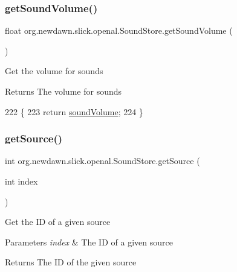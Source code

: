 \subsubsection{\texorpdfstring{get\+Sound\+Volume()}{getSoundVolume()}}
{\footnotesize\ttfamily float org.\+newdawn.\+slick.\+openal.\+Sound\+Store.\+get\+Sound\+Volume (\begin{DoxyParamCaption}{ }\end{DoxyParamCaption})\hspace{0.3cm}{\ttfamily [inline]}}

Get the volume for sounds

\begin{DoxyReturn}{Returns}
The volume for sounds 
\end{DoxyReturn}

\begin{DoxyCode}
222                                   \{
223         \textcolor{keywordflow}{return} \mbox{\hyperlink{classorg_1_1newdawn_1_1slick_1_1openal_1_1_sound_store_af4d5ad2dc31f33a212d52ff54fcfe4fd}{soundVolume}};
224     \}
\end{DoxyCode}
\mbox{\label{classorg_1_1newdawn_1_1slick_1_1openal_1_1_sound_store_a36b83b67fccef1cd5167d2ea11e89f6a}} 
\subsubsection{\texorpdfstring{get\+Source()}{getSource()}}
{\footnotesize\ttfamily int org.\+newdawn.\+slick.\+openal.\+Sound\+Store.\+get\+Source (\begin{DoxyParamCaption}\item[{int}]{index }\end{DoxyParamCaption})\hspace{0.3cm}{\ttfamily [inline]}}

Get the ID of a given source


\begin{DoxyParams}{Parameters}
{\em index} & The ID of a given source \\
\hline
\end{DoxyParams}
\begin{DoxyReturn}{Returns}
The ID of the given source 
\end{DoxyReturn}

